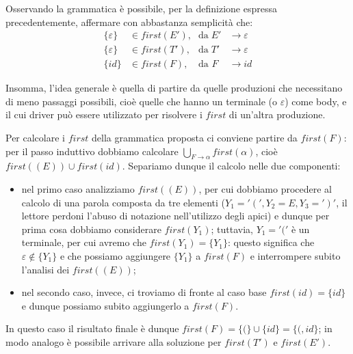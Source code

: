 \documentclass[class=book, crop=false, oneside, 12pt]{standalone}
\begin{document}
Osservando la grammatica è possibile, per la definizione espressa precedentemente, affermare con abbastanza semplicità che: 
\begin{align*}
    \{\varepsilon\} &\in first(E')\textrm{,} &\textrm{da}\; E' &\to \varepsilon \\
    \{\varepsilon\} &\in first(T')\textrm{,} &\textrm{da}\; T' &\to \varepsilon \\
    \{id\} &\in first(F)\textrm{,} &\textrm{da } F\; &\to id
\end{align*}

Insomma, l'idea generale è quella di partire da quelle produzioni che necessitano di meno passaggi possibili, cioè quelle che hanno un terminale (o \(\varepsilon\)) come body, e il cui driver può essere utilizzato per risolvere i \(first\) di un'altra produzione.

Per calcolare i \(first\) della grammatica proposta ci conviene partire da \(first(F)\): per il passo induttivo dobbiamo calcolare \(\bigcup_{F \to \alpha} first(\alpha)\), cioè \(first((E)) \cup first(id)\). Separiamo dunque il calcolo nelle due componenti:
\begin{itemize}
    \item nel primo caso analizziamo \(first((E))\), per cui dobbiamo procedere al calcolo di una parola composta da tre elementi (\(Y_1 = '(', Y_2 = E, Y_3 = ')'\), il lettore perdoni l'abuso di notazione nell'utilizzo degli apici) e dunque per prima cosa dobbiamo considerare \(first(Y_1)\); tuttavia, \(Y_1 = '('\) è un terminale, per cui avremo che \(first(Y_1) = \{Y_1\}\): questo significa che \(\varepsilon \notin \{Y_1\}\) e che possiamo aggiungere \(\{Y_1\}\) a \(first(F)\) e interrompere subito l'analisi dei \(first((E))\);
    \item nel secondo caso, invece, ci troviamo di fronte al caso base \(first(id) = \{id\}\) e dunque possiamo subito aggiungerlo a \(first(F)\).
\end{itemize}
In questo caso il risultato finale è dunque \(first(F) = \{(\} \cup \{id\} = \{(, id\}\); in modo analogo è possibile arrivare alla soluzione per \(first(T')\) e \(first(E')\).
\end{document}
